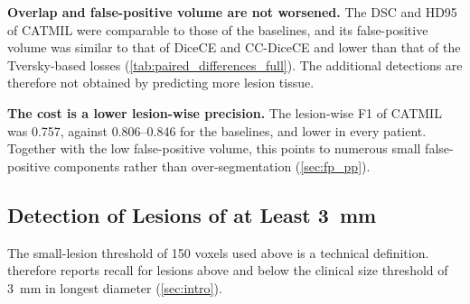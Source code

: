 \textbf{Overlap and false-positive volume are not worsened.} The DSC and
HD95 of CATMIL were comparable to those of the baselines, and its
false-positive volume was similar to that of DiceCE and CC-DiceCE and lower
than that of the Tversky-based losses (\cref{tab:paired_differences_full}).
The additional detections are therefore not obtained by predicting more
lesion tissue.

\textbf{The cost is a lower lesion-wise precision.} The lesion-wise F1 of
CATMIL was 0.757, against 0.806--0.846 for the baselines, and lower in every
patient. Together with the low false-positive volume, this points to
numerous small false-positive components rather than over-segmentation
(\cref{sec:fp_pp}).

\subsection{Detection of Lesions of at Least 3~mm}
\label{sec:clinical_size}

The small-lesion threshold of 150 voxels used above is a technical
definition.  therefore reports recall for lesions
above and below the clinical size threshold of 3~mm in longest diameter
(\cref{sec:intro}).

\begin{table}[t]
\centering
\caption{Lesion recall by lesion size relative to the 3~mm longest
diameter used in clinical MRI reading. $n$: number of reference lesions.
Recall is the fraction of lesions detected, averaged over the five fold
models. $\Delta$: CATMIL minus DiceCE or CC-DiceCE with 95\% patient-level
bootstrap CI; bold as in \cref{tab:paired_differences}.}
\label{tab:clinical_size}
\end{table}

